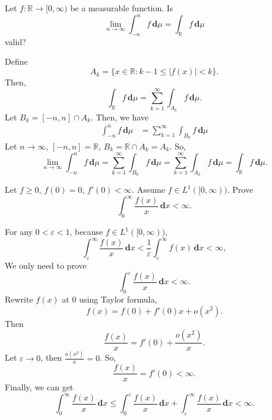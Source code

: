 \documentclass[12pt]{article}
\newenvironment{exercise}[1]{\begin{tcolorbox}[colback=black!15, colframe=black!80, breakable, title=#1]}{\end{tcolorbox}}
\newenvironment{solution}{\begin{tcolorbox}[colback=white, colframe=black!50, breakable, title=Solution. ]\setlength{\parskip}{0.8em}}{\end{tcolorbox}}
\newcommand{\der}{\,\mathbf{d}}
\begin{document}
    \begin{exercise}{7}
        Let $f : \mathbb{R} \to [0, \infty)$ be a measurable function. Is
        \[
            \lim_{n\to\infty}\int_{-n}^nf\der \mu=\int_\mathbb{R}f\der \mu
        \]
        valid? 
    \end{exercise}

    \begin{solution}
        Define
        \[
            A_k=\{x\in \mathbb{R}: k - 1 \leqslant |f(x)| < k\}. 
        \]
        Then, 
        \[
            \int_\mathbb{R}f\der \mu=\sum_{k = 1}^\infty\int_{A_k}f\der \mu. 
        \]
        Let $B_k=[-n, n]\cap A_k$. Then, we have
        \[
            \begin{aligned}
                \int_{-n}^{n} f\der \mu &= \sum_{k=1}^\infty\int_{B_k}f\der \mu
            \end{aligned}
        \]
        Let $n\to\infty$, $[-n,n]=\mathbb{R}$, $B_k=\mathbb{R}\cap A_k=A_k$. So, 
        \[
            \lim_{n\to\infty}\int_{-n}^{n} f\der \mu = \sum_{k=1}^\infty\int_{B_k}f\der \mu=\sum_{k = 1}^\infty\int_{A_k}f\der \mu=\int_\mathbb{R}f\der \mu. 
        \]
    \end{solution}

    \begin{exercise}{8}
        Let $f\geqslant0$, $f(0)=0$, $f'(0)<\infty$. Assume $f\in L^1([0,\infty))$. Prove
        \[
            \int_0^\infty\frac{f(x)}{x}\der x<\infty. 
        \]
    \end{exercise}

    \begin{solution}
        For any $0<\varepsilon<1$, because $f\in L^1([0,\infty))$, 
        \[
            \int_\varepsilon^\infty\frac{f(x)}{x}\der x<\frac{1}{\varepsilon}\int_\varepsilon^\infty f(x)\der x<\infty, 
        \]
        We only need to prove 
        \[
            \int_0^\varepsilon\frac{f(x)}{x}\der x<\infty. 
        \]
        Rewrite $f(x)$ at $0$ using Taylor formula, 
        \[
            f(x)=f(0)+f'(0)x+o(x^2). 
        \]
        Then
        \[
            \frac{f(x)}{x}=f'(0)+\frac{o(x^2)}{x}. 
        \]
        Let $\varepsilon\to 0$, then $\frac{o(x^2)}{x}=0$. So, 
        \[
            \frac{f(x)}{x}=f'(0)<\infty. 
        \]
        Finally, we can get
        \[
            \int_0^\infty\frac{f(x)}{x}\der x\leqslant\int_0^\varepsilon\frac{f(x)}{x}\der x+\int_\varepsilon^\infty\frac{f(x)}{x}\der x<\infty. 
        \]
    \end{solution}
\end{document}

